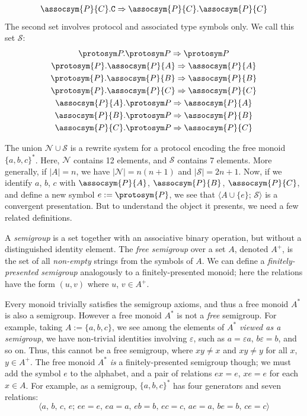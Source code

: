 \documentclass[../generics]{subfiles}
\begin{document}
\begin{example}
\begin{gather*}
\assocsym{P}{C}.\texttt{C}\Rightarrow\assocsym{P}{C}.\assocsym{P}{C}
\end{gather*}
The second set involves protocol and associated type symbols only. We call this set $\mathcal{S}$:
\begin{gather*}
\ProtoInherit{P}{P}\\
\protosym{P}.\assocsym{P}{A}\Rightarrow\assocsym{P}{A}\\
\protosym{P}.\assocsym{P}{B}\Rightarrow\assocsym{P}{B}\\
\protosym{P}.\assocsym{P}{C}\Rightarrow\assocsym{P}{C}\\
\ProtoConf{\assocsym{P}{A}}{P}\\
\ProtoConf{\assocsym{P}{B}}{P}\\
\ProtoConf{\assocsym{P}{C}}{P}
\end{gather*}

The union $\mathcal{N}\cup\mathcal{S}$ is a rewrite system for a protocol encoding the free monoid $\{a,b,c\}^*$. Here, $\mathcal{N}$ contains 12 elements, and $\mathcal{S}$ contains 7 elements. More generally, if $|A|=n$, we have $|\mathcal{N}|=n(n+1)$ and $|\mathcal{S}|=2n+1$. Now, if we identify $a$, $b$, $c$ with $\assocsym{P}{A}$, $\assocsym{P}{B}$, $\assocsym{P}{C}$, and define a new symbol $e:=\protosym{P}$, we see that $\langle A\cup\{e\};\,\mathcal{S}\rangle$ is a convergent presentation. But to understand the object it presents, we need a few related definitions.

A \emph{semigroup} is a set together with an associative binary operation, but without a distinguished identity element. The \emph{free semigroup} over a set $A$, denoted $A^+$, is the set of all \emph{non-empty} strings from the symbols of $A$. We can define a \emph{finitely-presented semigroup} analogously to a finitely-presented monoid; here the relations have the form $(u,v)$ where $u$, $v\in A^+$.

Every monoid trivially satisfies the semigroup axioms, and thus a free monoid $A^*$ is also a semigroup. However a free monoid $A^*$ is not a \emph{free} semigroup. For example, taking $A:=\{a,b,c\}$, we see among the elements of $A^*$ \emph{viewed as a semigroup}, we have non-trivial identities involving $\varepsilon$, such as $a=\varepsilon a$, $b\varepsilon=b$, and so on. Thus, this cannot be a free semigroup, where $xy\neq x$ and $xy\neq y$ for all $x$, $y\in A^+$. The free monoid $A^*$ \emph{is} a finitely-presented semigroup though; we must add the symbol $e$ to the alphabet, and a pair of relations $ex=e$, $xe=e$ for each $x\in A$. For example, as a semigroup, $\{a,b,c\}^*$ has four generators and seven relations:
\[\langle a,\,b,\,c,\,e;\,ee=e,\,ea=a,\,eb=b,\,ec=c,\,ae=a,\,be=b,\,ce=c\rangle\]


\end{example}
\end{document}
